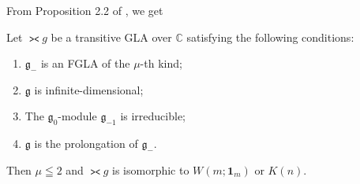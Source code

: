 From Proposition 2.2 of \cite{mt70:1}, we get
\begin{theorem}\label{thm6.1} Let $\gla g$ be a transitive GLA over $\mathbb C$
satisfying the following conditions:
\begin{enumerate}\itemsep=0pt
\renewcommand{\labelenumi}{$(\roman{enumi})$}
\item $\mathfrak g_-$ is an FGLA of the
$\mu$-th kind;
\item $\mathfrak g$ is infinite-dimensional;
\item The $\mathfrak g_0$-module $\mathfrak g_{-1}$ is irreducible;
\item $\mathfrak g$ is the prolongation of $\mathfrak g_-$.
\end{enumerate}
Then $\mu\leqq2$ and $\gla g$ is isomorphic to $W(m;{\bm 1}_m)$ or $K(n)$.
\end{theorem}
